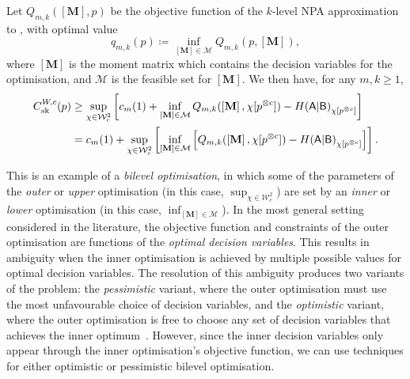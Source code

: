 \documentclass[10pt, a4paper]{article}
\numberwithin{equation}{section} %
\theoremstyle{definition}
\theoremstyle{plain}
\newcommand{\?}{\mathrel{?}} %
\newcommand{\matr}[2][]{\left[\mathbf{#2}#1\right]} %
\newcommand{\sM}{\mathcal{M}}
\newcommand{\sW}{\mathcal{W}}
\newcommand{\crv}[1]{\mathsf{#1}}
\newcommand{\sk}{\rm sk}
\begin{document}
                      Let \(Q_{m,k}(\matr{M}, p)\) be the objective function of the \(k\)-level NPA approximation to , with optimal value
                      \begin{equation}
                        q_{m,k}(p) \coloneqq \inf_{\matr{M}\in\sM} Q_{m,k}(p, \matr{M}),
                      \end{equation}
                      where \(\matr{M}\) is the moment matrix which contains the decision variables for the optimisation, and \(\sM\) is the feasible set for \(\matr{M}\). We then have, for any \(m,k\geq 1\),
                      \begin{align}
                        C^{W,c}_{\sk}(p) &\geq \sup_{\chi\in\sW_c^2} \left[ c_m(1) + \inf_{\matr{M}\in\sM} Q_{m,k}(\matr{M}, \chi[p^{\otimes c}]) - H{(\crv{A}|\crv{B})}_{\chi[p^{\otimes c}]} \right] \\
                                         &= c_m(1) + \sup_{\chi\in\sW_c^2} \left[ \inf_{\matr{M}\in\sM} \left[ Q_{m,k}(\matr{M}, \chi[p^{\otimes c}]) - H{(\crv{A}|\crv{B})}_{\chi[p^{\otimes c}]} \right] \right].
                      \end{align}

                      This is an example of a \emph{bilevel optimisation}, in which some of the parameters of the \emph{outer} or \emph{upper} optimisation (in this case, \(\sup_{\chi\in\sW_c^2}\)) are set by an \emph{inner} or \emph{lower} optimisation (in this case, \(\inf_{\matr{M}\in\sM}\)). In the most general setting considered in the literature, the objective function and constraints of the outer optimisation are functions of the \emph{optimal decision variables}. This results in ambiguity when the inner optimisation is achieved by multiple possible values for optimal decision variables. The resolution of this ambiguity produces two variants of the problem: the \emph{pessimistic} variant, where the outer optimisation must use the most unfavourable choice of decision variables, and the \emph{optimistic} variant, where the outer optimisation is free to choose any set of decision variables that achieves the inner optimum~\cite{BilevelReview}. However, since the inner decision variables only appear through the inner optimisation's objective function, we can use techniques for either optimistic or pessimistic bilevel optimisation.
\end{document}

